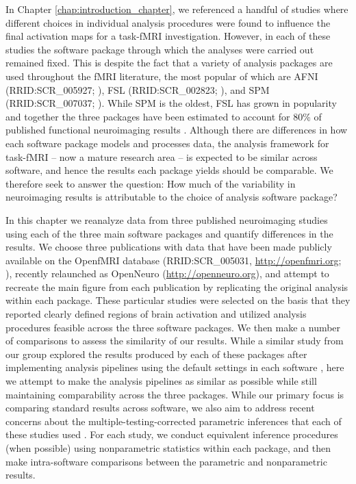 In Chapter \ref{chap:introduction_chapter}, we referenced a handful of studies where different choices in individual analysis procedures were found to influence the final activation maps for a task-fMRI investigation. However, in each of these studies the software package through which the analyses were carried out remained fixed. This is despite the fact that a variety of analysis packages are used throughout the fMRI literature, the most popular of which are AFNI (RRID:SCR\_005927; \citep{Cox1996-nu}), FSL (RRID:SCR\_002823; \citep{Jenkinson2012-wh}), and SPM (RRID:SCR\_007037; \citep{Penny2011-uk}). While SPM is the oldest, FSL has grown in popularity and together the three packages have been estimated to account for 80\% of published functional neuroimaging results \citep{Carp2012-yi}. Although there are differences in how each software package models and processes data, the analysis framework for task-fMRI -- now a mature research area -- is expected to be similar across software, and hence the results each package yields should be comparable. We therefore seek to answer the question: How much of the variability in neuroimaging results is attributable to the choice of analysis software package?

In this chapter we reanalyze data from three published neuroimaging studies using each of the three main software packages and quantify differences in the results. We choose three publications with data that have been made publicly available on the OpenfMRI database (RRID:SCR\_005031, \href{http://openfmri.org}{http://openfmri.org}; \citep{Poldrack2013-ss}), recently relaunched as OpenNeuro (\href{http://openneuro.org}{http://openneuro.org}), and attempt to recreate the main figure from each publication by replicating the original analysis within each package. These particular studies were selected on the basis that they reported clearly defined regions of brain activation and utilized analysis procedures feasible across the three software packages. We then make a number of comparisons to assess the similarity of our results. While a similar study from our group explored the results produced by each of these packages after implementing analysis pipelines using the default settings in each software \citep{Pauli2016-yz}, here we attempt to make the analysis pipelines as similar as possible while still maintaining comparability across the three packages. While our primary focus is comparing standard results across software, we also aim to address recent concerns about the multiple-testing-corrected parametric inferences that each of these studies used \citep{Eklund2016-ak}. For each study, we conduct equivalent inference procedures (when possible) using nonparametric statistics within each package, and then make intra-software comparisons between the parametric and nonparametric results.

